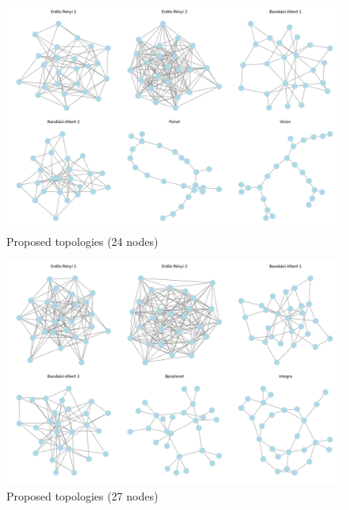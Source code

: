 \begin{figure}
    \centering
    \includegraphics[width=0.8\linewidth]{images/Topology set/24.png}
    \caption{Proposed topologies (24 nodes)}
    \label{fig:24_prop}
\end{figure}

\begin{figure}
    \centering
    \includegraphics[width=0.8\linewidth]{images/Topology set/27.png}
    \caption{Proposed topologies (27 nodes)}
    \label{fig:27_prop}
\end{figure}

\newpage